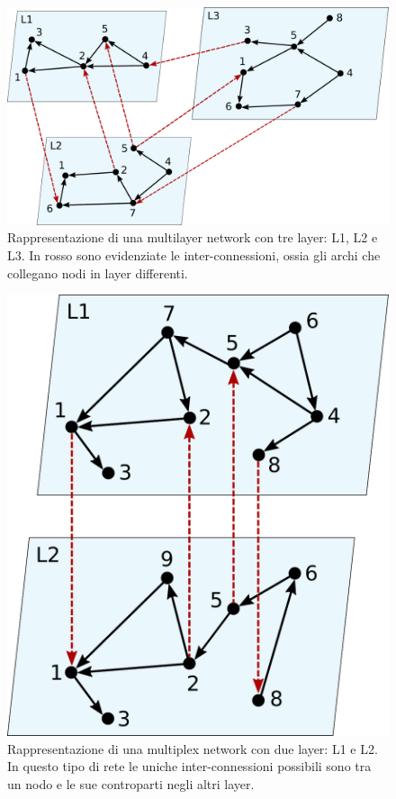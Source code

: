 \begin{figure}[h]
    \centering
    \includegraphics[height=0.3\textheight]{img/mlexample1.pdf}
    \caption{Rappresentazione di una multilayer network con tre layer: L1, L2 e L3.
    In rosso sono evidenziate le inter-connessioni, ossia gli archi che collegano nodi in 
    layer differenti.}
    \label{fig:mlexample}
\end{figure}

\begin{figure}
    \centering
    \includegraphics[height=0.3\textheight]{img/muxexample1.pdf}
    \caption{Rappresentazione di una multiplex network con due layer: L1 e L2. In questo 
    tipo di rete le uniche inter-connessioni possibili sono tra un nodo e le sue controparti 
    negli altri layer.}
    \label{fig:muxexample}
\end{figure}

